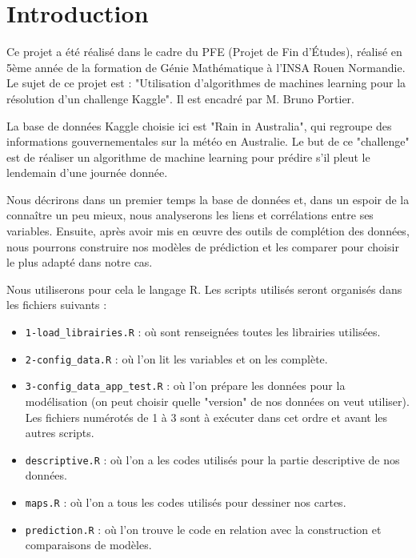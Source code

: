 \documentclass{article}
\begin{document}
\pagestyle{fancy}
\fancyhf{}
\fancyfoot[C]{\thepage}
\setlength{\headwidth}{15cm}
\setlength{\headheight}{38pt}
\setlength{\footskip}{15pt}

\newpage

\tableofcontents
\listoffigures
\listoftables
\newpage

\part{Introduction}
Ce projet a été réalisé dans le cadre du PFE (Projet de Fin d'Études), réalisé en 5ème année de la formation de Génie Mathématique à l'INSA Rouen Normandie. Le sujet de ce projet est : "Utilisation d’algorithmes de machines learning pour la résolution d’un challenge Kaggle". Il est encadré par M. Bruno Portier.  

La base de données Kaggle choisie ici est "Rain in Australia", qui regroupe des informations gouvernementales sur la météo en Australie. Le but de ce "challenge" est de réaliser un algorithme de machine learning pour prédire s'il pleut le lendemain d'une journée donnée. 

Nous décrirons dans un premier temps la base de données et, dans un espoir de la connaître un peu mieux, nous analyserons les liens et corrélations entre ses variables. Ensuite, après avoir mis en œuvre des outils de complétion des données, nous pourrons construire nos modèles de prédiction et les comparer pour choisir le plus adapté dans notre cas. 

Nous utiliserons pour cela le langage R. Les scripts utilisés seront organisés dans les fichiers suivants : 
\begin{itemize}
    \item \texttt{1-load_librairies.R} : où sont renseignées toutes les librairies utilisées.
    \item \texttt{2-config_data.R} : où l'on lit les variables et on les complète.
    \item \texttt{3-config_data_app_test.R} : où l'on prépare les données pour la modélisation (on peut choisir quelle "version" de nos données on veut utiliser). Les fichiers numérotés de 1 à 3 sont à exécuter dans cet ordre et avant les autres scripts.
    \item \texttt{descriptive.R} : où l'on a les codes utilisés pour la partie descriptive de nos données.
    \item \texttt{maps.R} : où l'on a tous les codes utilisés pour dessiner nos cartes.
    \item \texttt{prediction.R} : où l'on trouve le code en relation avec la construction et comparaisons de modèles.
\end{itemize}
\end{document}
